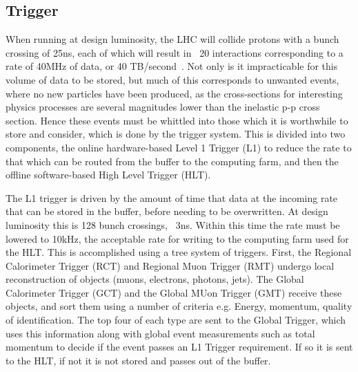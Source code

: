 \subsection{Trigger}

When running at design luminosity, the LHC will collide protons with a bunch crossing of 25ns, each of which will result in ~20 interactions corresponding to a rate of 40MHz of data, or 40 TB/second~\cite{TRIGTDR}. Not only is it impracticable for this volume of data to be stored, but much of this corresponds to unwanted events, where no new particles have been produced, as the cross-sections for interesting physics processes are several magnitudes lower than the inelastic p-p cross section. Hence these events must be whittled into those which it is worthwhile to store and consider, which is done by the trigger system. This is divided into two components, the online hardware-based Level 1 Trigger (L1) to reduce the rate to that which can be routed from the buffer to the computing farm, and then the offline software-based High Level Trigger (HLT). 

The L1 trigger is driven by the amount of time that data at the incoming rate that can be stored in the buffer, before needing to be overwritten. At design luminosity this is 128 bunch crossings, ~3ns. Within this time the rate must be lowered to 10kHz, the acceptable rate for writing to the computing farm used for the HLT. This is accomplished using a tree system of triggers. First, the Regional Calorimeter Trigger (RCT) and Regional Muon Trigger (RMT) undergo local reconstruction of objects (muons, electrons, photons, jets). The Global Calorimeter Trigger (GCT) and the Global MUon Trigger (GMT) receive these objects, and sort them using a number of criteria e.g. Energy, momentum, quality of identification. The top four of each type are sent to the Global Trigger, which uses this information along with global event measurements such as total momentum to decide if the event passes an L1 Trigger requirement. If so it is sent to the HLT, if not it is not stored and passes out of the buffer. 

